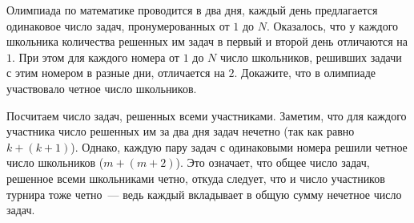 \problem
Олимпиада по математике проводится в два дня, каждый день предлагается
одинаковое число задач, пронумерованных от $1$ до $N$.
Оказалось, что у каждого школьника количества решенных им задач в первый и
второй день отличаются на $1$.
При этом для каждого номера от $1$ до $N$ число школьников, решивших задачи с
этим номером в разные дни, отличается на $2$.
Докажите, что в олимпиаде участвовало четное число школьников.

\solution
Посчитаем число задач, решенных всеми участниками.
Заметим, что для каждого участника число решенных им за два дня задач нечетно
(так как равно $k + (k + 1)$).
Однако, каждую пару задач с одинаковыми номера решили четное число школьников
($m + (m + 2)$).
Это означает, что общее число задач, решенное всеми школьниками четно, откуда
следует, что и число участников турнира тоже четно~--- ведь каждый вкладывает
в общую сумму нечетное число задач.

\endproblem
